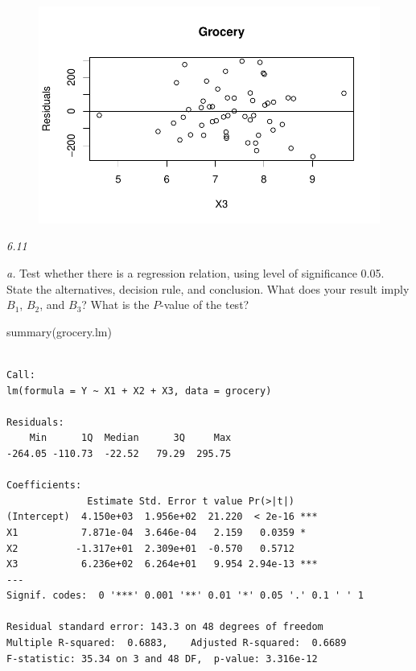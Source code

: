 \documentclass[
  letterpaper,
  DIV=11,
  numbers=noendperiod]{scrartcl}
\newenvironment{Shaded}{\begin{snugshade}}{\end{snugshade}}
\newcommand{\FunctionTok}[1]{\textcolor[rgb]{0.28,0.35,0.67}{#1}}
\newcommand{\NormalTok}[1]{\textcolor[rgb]{0.00,0.23,0.31}{#1}}
\begin{document}
\begin{figure}[H]

{\centering \includegraphics{sta9700_herlan_ch6_2023_04_12_files/figure-pdf/unnamed-chunk-19-1.pdf}

}

\end{figure}

\emph{6.11}

\emph{a.} Test whether there is a regression relation, using level of
significance 0.05. State the alternatives, decision rule, and
conclusion. What does your result imply \(B_{1}\), \(B_{2}\), and
\(B_{3}\)? What is the \(P\)-value of the test?

\begin{Shaded}
\begin{Highlighting}[]
\FunctionTok{summary}\NormalTok{(grocery.lm)}
\end{Highlighting}
\end{Shaded}

\begin{verbatim}

Call:
lm(formula = Y ~ X1 + X2 + X3, data = grocery)

Residuals:
    Min      1Q  Median      3Q     Max 
-264.05 -110.73  -22.52   79.29  295.75 

Coefficients:
              Estimate Std. Error t value Pr(>|t|)    
(Intercept)  4.150e+03  1.956e+02  21.220  < 2e-16 ***
X1           7.871e-04  3.646e-04   2.159   0.0359 *  
X2          -1.317e+01  2.309e+01  -0.570   0.5712    
X3           6.236e+02  6.264e+01   9.954 2.94e-13 ***
---
Signif. codes:  0 '***' 0.001 '**' 0.01 '*' 0.05 '.' 0.1 ' ' 1

Residual standard error: 143.3 on 48 degrees of freedom
Multiple R-squared:  0.6883,    Adjusted R-squared:  0.6689 
F-statistic: 35.34 on 3 and 48 DF,  p-value: 3.316e-12
\end{verbatim}
\end{document}
